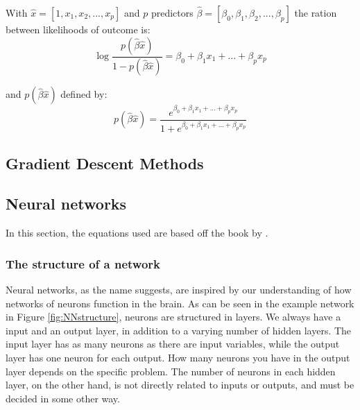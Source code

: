 With $\hat{x} = [1, x_1,x_2,...,x_p]$ and $p$ predictors $\hat{\beta} = [\beta_0,\beta_1,\beta_2,...,\beta_p]$ the ration between likelihoods of outcome is:
\begin{equation}
  \log \frac{p(\hat{\beta}\hat{x})}{1-p(\hat{\beta}\hat{x})} = \beta_0 + \beta_1x_1 + ... + \beta_px_p
  \label{eq:prob_ratio}
\end{equation}

\noindent and $p(\hat{\beta}\hat{x})$ defined by:
\begin{equation}
  p(\hat{\beta}\hat{x}) = \frac{e^{\beta_0 + \beta_1x_1 + ... + \beta_px_p}}{1+e^{\beta_0 + \beta_1x_1 + ... + \beta_px_p}}
  \label{eq:pBx}
\end{equation}

\subsection{Gradient Descent Methods}

\subsection{Neural networks} 
In this section, the equations used are based off the book by \cite{Nielsen}.
\subsubsection*{The structure of a network}
Neural networks, as the name suggests, are inspired by our understanding of how networks of neurons function in the brain. As can be seen in the example network in Figure \ref{fig:NNstructure}, neurons are structured in layers. We always have a input and an output layer, in addition to a varying number of hidden layers. The input layer has as many neurons as there are input variables, while the output layer has one neuron for each output. How many neurons you have in the output layer depends on the specific problem. The number of neurons in each hidden layer, on the other hand, is not directly related to inputs or outputs, and must be decided in some other way. 

